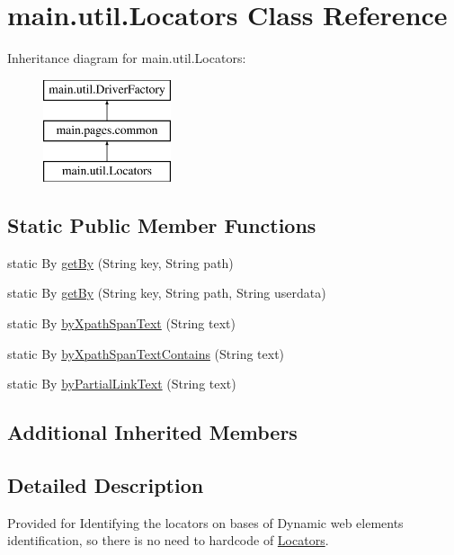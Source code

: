 \hypertarget{classmain_1_1util_1_1_locators}{}\section{main.\+util.\+Locators Class Reference}
\label{classmain_1_1util_1_1_locators}
Inheritance diagram for main.\+util.\+Locators\+:\begin{figure}[H]
\begin{center}
\leavevmode
\includegraphics[height=3.000000cm]{classmain_1_1util_1_1_locators}
\end{center}
\end{figure}
\subsection*{Static Public Member Functions}
\begin{DoxyCompactItemize}
\item 
static By \mbox{\hyperlink{classmain_1_1util_1_1_locators_abfccf35b881fdba5d096dfed34153a7e}{get\+By}} (String key, String path)
\item 
static By \mbox{\hyperlink{classmain_1_1util_1_1_locators_a1c63d6c289e5b1f5f4b0a399cf6d20b6}{get\+By}} (String key, String path, String userdata)
\item 
static By \mbox{\hyperlink{classmain_1_1util_1_1_locators_a2aff991dbee052ae04c110eaa6a94686}{by\+Xpath\+Span\+Text}} (String text)
\item 
static By \mbox{\hyperlink{classmain_1_1util_1_1_locators_a8c86ef6c524f7ec696db7f81d6243211}{by\+Xpath\+Span\+Text\+Contains}} (String text)
\item 
static By \mbox{\hyperlink{classmain_1_1util_1_1_locators_a19c55393acbfebff041901aa2917d489}{by\+Partial\+Link\+Text}} (String text)
\end{DoxyCompactItemize}
\subsection*{Additional Inherited Members}


\subsection{Detailed Description}
Provided for Identifying the locators on bases of Dynamic web elements identification, so there is no need to hardcode of \mbox{\hyperlink{classmain_1_1util_1_1_locators}{Locators}}. 

